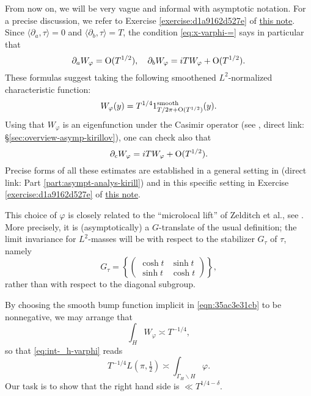 \documentclass[reqno]{amsart} 
\numberwithin{equation}{section}
\numberwithin{theorem}{section}
\begin{document}
From now on, we will be very vague and informal with asymptotic notation.  For a precise discussion, we refer to Exercise \ref{exercise:d1a9162d527e} of \href{20230524T094424__exercises-localized-vectors.tex.pdf}{this note}.  Since $\langle \partial_a, \tau \rangle = 0$ and $\langle \partial_b, \tau \rangle = T$, the condition \eqref{eq:x-varphi-=} says in particular that
\begin{equation*}
  \partial_a W_\varphi = \operatorname{O}(T^{1/2}),
  \quad
  \partial_b W_\varphi = i T W_\varphi + \operatorname{O}(T^{1/2}).
\end{equation*}
These formulas suggest taking the following smoothened $L^2$-normalized characteristic function:
\begin{equation}\label{eqn:35ac3e31cb}
  W_\varphi(y) = T^{1/4} 1_{T / 2 \pi + \operatorname{O}(T^{1/2})}^{\text{smooth}}(y).
\end{equation}
Using that $W_\varphi$ is an eigenfunction under the Casimir operator (see \cite[\S12]{2021arXiv210915230N}, direct link: \S\ref{sec:overview-asymp-kirillov}), one can check also that
\begin{equation*}
  \partial_c W_\varphi = i T W_\varphi + \operatorname{O}(T^{1/2}).
\end{equation*}
Precise forms of all these estimates are established in a general setting in \cite[Part 3]{2021arXiv210915230N} (direct link: Part \ref{part:asympt-analys-kirill}) and in this specific setting in Exercise \ref{exercise:d1a9162d527e} of \href{20230524T094424__exercises-localized-vectors.tex.pdf}{this note}.
\begin{remark}
  This choice of $\varphi$ is closely related to the ``microlocal lift'' of Zelditch \cite{MR916129} et al., see \cite{MR1859345, MR2346281, MR2314452}.  More precisely, it is (asymptotically) a $G$-translate of the usual definition; the limit invariance for $L^2$-masses will be with respect to the stabilizer $G_\tau$ of $\tau$, namely
\begin{equation}\label{eqn:G-tau}
  G_\tau = \left\{ \begin{pmatrix}
      \cosh t & \sinh t \\
      \sinh t & \cosh t
    \end{pmatrix} \right\},
\end{equation}
rather than with respect to the diagonal subgroup.
\end{remark}

By choosing the smooth bump function implicit in \eqref{eqn:35ac3e31cb} to be nonnegative, we may arrange that
\begin{equation*}
  \int_{H} W_\varphi \asymp  T^{-1/4},
\end{equation*}
so that \eqref{eq:int-_h-varphi} reads
\begin{equation}\label{eqn:35ac3e32a4}
  T^{-1/4} L(\pi,\tfrac{1}{2}) \asymp  \int_{\Gamma_{H} \backslash H} \varphi.
\end{equation}
Our task is to show that the right hand side is $\ll T^{1/4-\delta}$.
\end{document}
